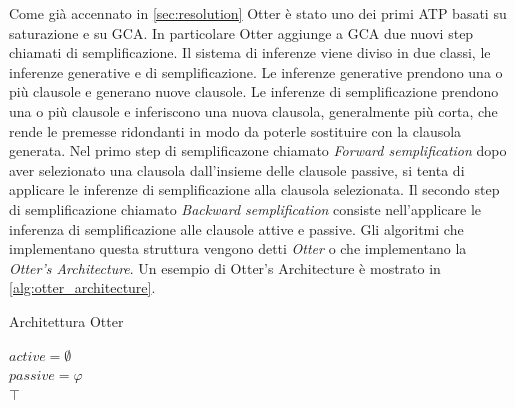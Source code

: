 \documentclass[./main.tex]{subfiles}
\begin{document}
Come già accennato in \ref{sec:resolution} Otter è stato uno dei primi ATP basati su saturazione e su GCA.
In particolare Otter aggiunge a GCA due nuovi step chiamati di semplificazione.
Il sistema di inferenze viene diviso in due classi, le inferenze generative e di semplificazione.
Le inferenze generative prendono una o più clausole e generano nuove clausole.
Le inferenze di semplificazione prendono una o più clausole e inferiscono 
una nuova clausola, generalmente più corta, che rende le premesse ridondanti in modo da poterle sostituire
con la clausola generata. 
Nel primo step di semplificazone chiamato \textit{Forward semplification} dopo aver selezionato una 
clausola dall'insieme delle clausole passive, si tenta di applicare le inferenze di semplificazione
alla clausola selezionata. Il secondo step di semplificazione chiamato \textit{Backward semplification}
consiste nell'applicare le inferenza di semplificazione alle clausole attive e passive.
Gli algoritmi che implementano questa struttura vengono detti \textit{Otter} o che
implementano la \textit{Otter's Architecture}. Un esempio di Otter's Architecture è mostrato in \ref{alg:otter_architecture}.

\begin{algorithm}[H]
    \caption{Architettura Otter} \label{alg:otter_architecture}


    $active = \emptyset$ \\
    $passive = \varphi$ \\

    \Return $\top$\;    
\end{algorithm}
\end{document}

